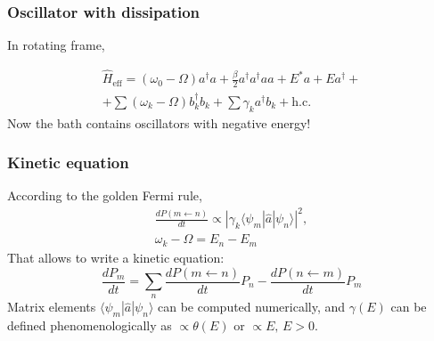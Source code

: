 \documentclass{beamer}
\begin{document}
\begin{frame}
    \frametitle{Oscillator with dissipation}
    In rotating frame,
        
    \begin{multline*}
        \hat{H}_\mathrm{eff} = (\omega_0 - \Omega) a^\dagger a + 
                            \frac{\beta}{2} a^\dagger a^\dagger a a + 
                    E^* a + Ea^\dagger + \\
                    + \sum (\omega_k - \Omega) b_k^\dagger b_k + 
                    \sum \gamma_k a^\dagger b_k + \mathrm{h. c.}
    \end{multline*}
    Now the bath contains oscillators with negative energy!
\end{frame}

\begin{frame}
    \frametitle{Kinetic equation}
    According to the golden Fermi rule,
    \begin{equation*}
        \begin{gathered}
            \frac{dP(m \leftarrow n)}{dt} \propto | \gamma_k \langle \psi_m | \hat{a} | \psi_n \rangle|^2,\\
            \omega_k - \Omega = E_n - E_m
        \end{gathered}
    \end{equation*}
    That allows to write a kinetic equation:
    \begin{equation*}
        \frac{dP_m}{dt} = \sum_n \frac{dP(m \leftarrow n)}{dt} P_n - \frac{dP(n \leftarrow m)}{dt} P_m
    \end{equation*}
    Matrix elements $\langle \psi_m | \hat{a} | \psi_n \rangle$ can be computed numerically, and
    $\gamma(E)$ can be defined phenomenologically as $\propto \theta(E)$ or $\propto E,\, E > 0$.
\end{frame}
\end{document}
